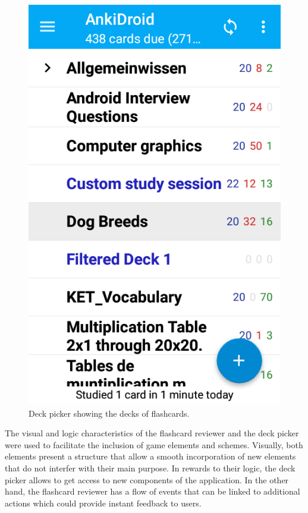 \begin{figure}[htb]
    \vskip 5mm
        \begin{center}
            \includegraphics[scale=0.4]{./Figures/picker.png}
            \caption{Deck picker showing the decks of flashcards.}
            \label{fig:deck-picker}
        \end{center}
    \vskip -5mm
\end{figure}

The visual and logic characteristics of the flashcard reviewer and the deck picker were used to facilitate the inclusion of game elements and schemes. Visually, both elements present a structure that allow a smooth incorporation of new elements that do not interfer with their main purpose. In rewards to their logic, the deck picker allows to get access to new components of the application. In the other hand, the flashcard reviewer has a flow of events that can be linked to additional actions which could provide instant feedback to users.

